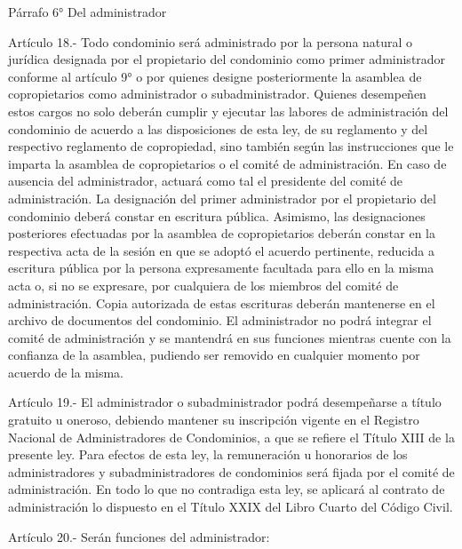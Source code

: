      
    Párrafo 6°
    Del administrador

     
    Artículo 18.- Todo condominio será administrado por la persona natural o jurídica designada por el propietario del condominio como primer administrador conforme al artículo 9° o por quienes designe posteriormente la asamblea de copropietarios como administrador o subadministrador. Quienes desempeñen estos cargos no solo deberán cumplir y ejecutar las labores de administración del condominio de acuerdo a las disposiciones de esta ley, de su reglamento y del respectivo reglamento de copropiedad, sino también según las instrucciones que le imparta la asamblea de copropietarios o el comité de administración. En caso de ausencia del administrador, actuará como tal el presidente del comité de administración.
    La designación del primer administrador por el propietario del condominio deberá constar en escritura pública. Asimismo, las designaciones posteriores efectuadas por la asamblea de copropietarios deberán constar en la respectiva acta de la sesión en que se adoptó el acuerdo pertinente, reducida a escritura pública por la persona expresamente facultada para ello en la misma acta o, si no se expresare, por cualquiera de los miembros del comité de administración. Copia autorizada de estas escrituras deberán mantenerse en el archivo de documentos del condominio.
    El administrador no podrá integrar el comité de administración y se mantendrá en sus funciones mientras cuente con la confianza de la asamblea, pudiendo ser removido en cualquier momento por acuerdo de la misma.
     
    Artículo 19.- El administrador o subadministrador podrá desempeñarse a título gratuito u oneroso, debiendo mantener su inscripción vigente en el Registro Nacional de Administradores de Condominios, a que se refiere el Título XIII de la presente ley.
    Para efectos de esta ley, la remuneración u honorarios de los administradores y subadministradores de condominios será fijada por el comité de administración.
    En todo lo que no contradiga esta ley, se aplicará al contrato de administración lo dispuesto en el Título XXIX del Libro Cuarto del Código Civil.
     
    Artículo 20.- Serán funciones del administrador:
     
